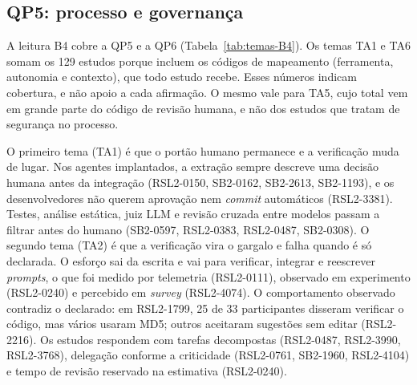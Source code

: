 \subsection{QP5: processo e governança}
\label{sec:resultados-rsl2-qp5}



A leitura B4 cobre a QP5 e a QP6 (Tabela~\ref{tab:temas-B4}). Os temas TA1 e
TA6 somam os 129 estudos porque incluem os códigos de mapeamento (ferramenta,
autonomia e contexto), que todo estudo recebe. Esses números indicam
cobertura, e não apoio a cada afirmação. O mesmo vale para TA5, cujo total
vem em grande parte do código de revisão humana, e não dos estudos que tratam
de segurança no processo.

O primeiro tema (TA1) é que o portão humano permanece e a verificação muda de
lugar. Nos agentes implantados, a extração sempre descreve uma decisão humana
antes da integração (RSL2-0150, SB2-0162, SB2-2613, SB2-1193), e os
desenvolvedores não querem aprovação nem \textit{commit} automáticos
(RSL2-3381). Testes, análise estática, juiz LLM e revisão cruzada entre
modelos passam a filtrar antes do humano (SB2-0597, RSL2-0383, RSL2-0487,
SB2-0308). O segundo tema (TA2) é que a verificação vira o gargalo e falha
quando é só declarada. O esforço sai da escrita e vai para verificar,
integrar e reescrever \textit{prompts}, o que foi medido por telemetria
(RSL2-0111), observado em experimento (RSL2-0240) e percebido em
\textit{survey} (RSL2-4074). O comportamento observado contradiz o declarado:
em RSL2-1799, 25 de 33 participantes disseram verificar o código, mas vários
usaram MD5; outros aceitaram sugestões sem editar (RSL2-2216). Os estudos
respondem com tarefas decompostas (RSL2-0487, RSL2-3990, RSL2-3768),
delegação conforme a criticidade (RSL2-0761, SB2-1960, RSL2-4104) e tempo de
revisão reservado na estimativa (RSL2-0240).


